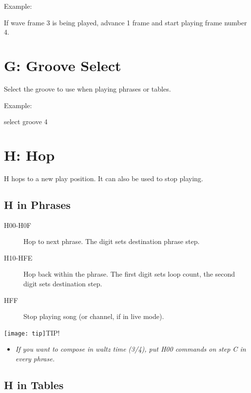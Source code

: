 \begin{description}
\item Example:
\item[F01] If wave frame 3 is being played, advance 1 frame and start playing frame number 4.
\end{description}

\section{G: Groove Select}

Select the groove to use when playing phrases or tables.

\begin{description}
\item Example:
\item[G04] select groove 4
\end{description}

\section{H: Hop}

H hops to a new play position. It can also be used to stop playing.

\subsection{H in Phrases}

\begin{description}
    \item[H00-H0F] Hop to next phrase. The digit sets destination phrase step.
    \item[H10-HFE] Hop back within the phrase. The first digit sets loop count, the second digit sets destination step.
    \item[HFF] Stop playing song (or channel, if in live mode).
\end{description}

\texttt{[image: tip]}TIP!
\nolinebreak
\begin{itemize}
        \item \textit{If you want to compose in waltz time (3/4), put \textsc{H00} commands on step \textsc{C} in every phrase.}
\end{itemize}


\subsection{H in Tables}


